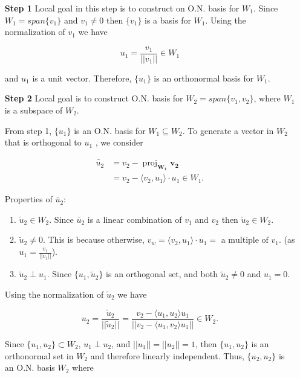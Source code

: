 \documentclass[12pt]{article}
\DeclareMathOperator{\proj}{proj}
\newcommand{\vct}{\mathbf}
\newcommand{\vctproj}[2][]{\proj_{\vct{#1}}\vct{#2}}
\theoremstyle{definition}
\begin{document}
\begin{itemize}
\item [\textbf{Step 1}] Local goal in this step is to construct on O.N. basis for $W_1$.
Since $W_1 = span\{v_1\}$ and $v_1 \neq 0$ then $\{v_1\}$ is a basis for $W_1$. Using the
normalization of $v_1$ we have

\[u_1 = \frac{v_1}{||v_1||} \in W_1 \]

and $u_1$ is a unit vector. Therefore, $\{u_1\}$ is an orthonormal basis for $W_1$.

\item [\textbf{Step 2}] Local goal is to construct O.N. basis for 
$W_2 = span \{v_1, v_2 \}$, where $W_1$ is a subspace of $W_2$.

From step 1, $\{u_1\}$ is an O.N. basis for $W_1 \subseteq W_2$. To generate a vector 
in $W_2$ that is orthogonal to $u_1$ , we consider

\begin{align*}
\tilde{u_2} &= v_2 - \vctproj[W_1]{v_2} \\
&= v_2 - \langle v_2, u_1 \rangle \cdot u_1 \in W_1.
\end{align*}

Properties of $\tilde{u_2}$:
\begin{enumerate}[label = (\arabic*)]
\item $\widetilde{u}_2 \in W_2$. Since $\widetilde{u_2}$ is a linear combination of $v_1$
and $v_2$ then $\widetilde{u}_2 \in W_2$.

\item $\widetilde{u}_{2} \neq 0$. This is because otherwise, 
$v_w = \langle v_2, u_1 \rangle \cdot u_1 = \text{ a multiple of } v_1$. 
(as $\displaystyle u_1 = \frac{v_1}{||v_1||}$).

\item $\widetilde{u}_2 \perp u_1$. Since $\{u_1, \widetilde{u}_2 \}$ is an
orthogonal set, and both $\widetilde{u}_2 \neq 0$ and $u_1 = 0$.
\end{enumerate}

Using the normalization of $\widetilde{u}_2$ we have

\[ u_2 = \frac{\widetilde{u}_2}{||\widetilde{u}_2||} =
\frac{v_2 - \langle u_1, u_2 \rangle u_1}{||v_2 - \langle u_1, v_2 \rangle u_1 ||} \in W_2. \]

Since $\{u_1, u_2\} \subset W_2$, $u_1 \perp u_2$, and $||u_1|| = ||u_2|| = 1$, then
$\{u_1, u_2\}$ is an orthonormal set in $W_2$ and therefore linearly independent. Thus,
$\{u_2, u_2\}$ is an O.N. basis $W_2$ where


\end{itemize}
\end{document}

